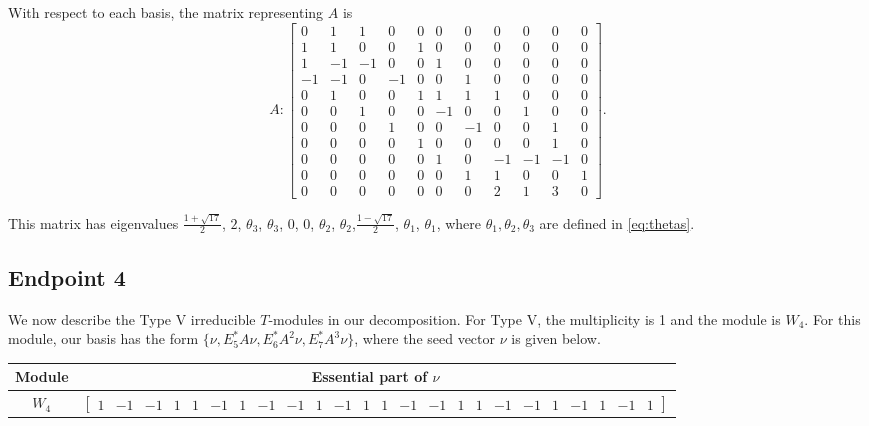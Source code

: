 \documentclass[12pt,letterpaper]{article}
\newcommand{\smallrowvector}[1]{\left[\begin{smallmatrix} #1 \end{smallmatrix}\right]}
\begin{document}
With respect to each basis, the matrix representing $A$ is 
\begin{equation}
    A: \begin{bmatrix}
  0 & 1 & 1 & 0 & 0 & 0 & 0 & 0 & 0 & 0 & 0 \\
  1 & 1 & 0 & 0 & 1 & 0 & 0 & 0 & 0 & 0 & 0 \\
  1 & -1 & -1 & 0 & 0 & 1 & 0 & 0 & 0 & 0 & 0 \\
  -1 & -1 & 0 & -1 & 0 & 0 & 1 & 0 & 0 & 0 & 0 \\
  0 & 1 & 0 & 0 & 1 & 1 & 1 & 1 & 0 & 0 & 0 \\
  0 & 0 & 1 & 0 & 0 & -1 & 0 & 0 & 1 & 0 & 0 \\
  0 & 0 & 0 & 1 & 0 & 0 & -1 & 0 & 0 & 1 & 0 \\
  0 & 0 & 0 & 0 & 1 & 0 & 0 & 0 & 0 & 1 & 0 \\
  0 & 0 & 0 & 0 & 0 & 1 & 0 & -1 & -1 & -1 & 0 \\
  0 & 0 & 0 & 0 & 0 & 0 & 1 & 1 & 0 & 0 & 1 \\
  0 & 0 & 0 & 0 & 0 & 0 & 0 & 2 & 1 & 3 & 0 \end{bmatrix}.
\label{eq:bs-IV}
\end{equation}

This matrix has eigenvalues $\frac{1+\sqrt{17}}{2}$, $2$, $\theta_3$, $\theta_3$, $0$, $0$, $\theta_2$, $\theta_2$,$\frac{1-\sqrt{17}}{2}$, $\theta_1$, $\theta_1$, where $\theta_1, \theta_2, \theta_3 $ are defined in \eqref{eq:thetas}.

\subsection{Endpoint 4}

We now describe the Type V irreducible $T$-modules in our decomposition. For Type V, the multiplicity is 1 and the module is  $W_4$. For this module, our basis has the form $\{\nu, E_5^*A\nu, E_6^*A^2\nu, E_7^*A^3\nu\}$, where the seed vector $\nu$ is given below.
\begin{center}
    \begin{tabular}{c | c}
    \toprule
       \textbf{Module}  & \textbf {Essential part of }$\nu$ \\
       \midrule
       $W_{4}$  & $\smallrowvector{1 & -1 & -1 & 1 & 1 & -1 & 1 & -1 & -1 & 1 & -1 & 1 & 1 & -1 & -1 & 1 & 1 & -1 & -1 & 1 & -1 & 1 & -1 & 1}$ \\
    \bottomrule
    \end{tabular}
\end{center}
\end{document}
